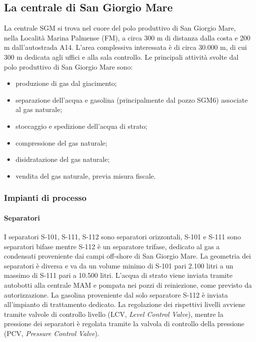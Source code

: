 \subsection{La centrale di San Giorgio Mare}
La centrale SGM si trova nel cuore del polo produttivo di San Giorgio Mare, nella Località Marina Palmense (FM), a circa 300 m di distanza dalla costa e 200 m dall'autostrada A14. L'area complessiva interessata è di circa 30.000 m, di cui 300 m dedicata agli uffici e alla sala controllo.
Le principali attività svolte dal polo produttivo di San Giorgio Mare sono:
\begin{itemize}
 	\item produzione di gas dal giacimento;
 	\item separazione dell'acqua e gasolina (principalmente dal pozzo SGM6) associate al gas naturale;
 	\item stoccaggio e spedizione dell'acqua di strato;
 	\item compressione del gas naturale;
 	\item disidratazione del gas naturale;
 	\item vendita del gas naturale, previa misura fiscale.
\end{itemize}

\subsubsection{Impianti di processo}
\paragraph{Separatori}
I separatori S-101, S-111, S-112 sono separatori orizzontali, S-101 e S-111 sono separatori bifase mentre S-112 è un separatore trifase, dedicato al gas a condensati proveniente dai campi off-shore di San Giorgio Mare. La geometria dei separatori è diversa e va da un volume minimo di S-101 pari 2.100 litri a un massimo di S-111 pari a 10.500 litri. L'acqua di strato viene  inviata tramite autobotti alla centrale MAM e pompata nei pozzi di reiniezione, come previsto da autorizzazione. La gasolina proveniente dal solo separatore S-112 è inviata all'impianto di trattamento dedicato.
La regolazione dei rispettivi livelli avviene tramite valvole di controllo livello (LCV, \textit{Level Control Valve}), mentre la pressione dei separatori è regolata tramite la valvola di controllo della pressione (PCV, \textit{Pressure Control Valve}).

